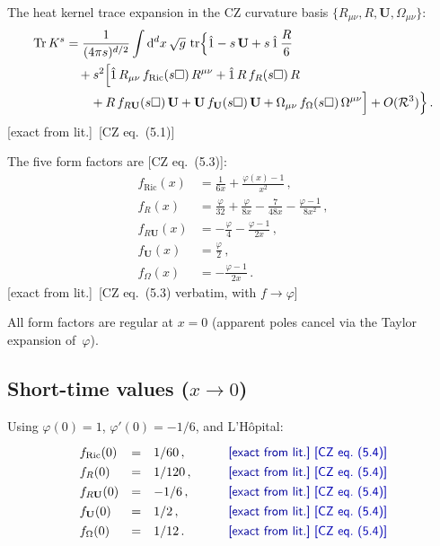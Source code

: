 \documentclass[12pt,a4paper]{article}
\theoremstyle{definition}
\theoremstyle{remark}
\newcommand{\Tr}{\operatorname{Tr}}
\newcommand{\tr}{\operatorname{tr}}
\newcommand{\dd}{\mathrm{d}}
\newcommand{\fromlit}[1]{\textcolor{blue!70!black}{\textsf{[#1]}}}
\newcommand{\exactlit}{\textcolor{blue!60!black}{\textsf{[exact from lit.]}}}
\begin{document}
The heat kernel trace expansion in the CZ curvature basis
$\{R_{\mu\nu}, R, \mathbf{U}, \Omega_{\mu\nu}\}$:
\begin{align}
  \Tr K^s &= \frac{1}{(4\pi s)^{d/2}}\int \dd^d x\,\sqrt{g}\,\tr\Bigl\{
    \hat{1} - s\,\mathbf{U} + s\,\hat{1}\,\frac{R}{6}
    \nonumber\\
  &\quad + s^2\Bigl[
    \hat{1}\,R_{\mu\nu}\,f_{\mathrm{Ric}}(s\Box)\,R^{\mu\nu}
    + \hat{1}\,R\,f_R(s\Box)\,R
    \nonumber\\
  &\quad\quad
    + R\,f_{R\mathbf{U}}(s\Box)\,\mathbf{U}
    + \mathbf{U}\,f_{\mathbf{U}}(s\Box)\,\mathbf{U}
    + \Omega_{\mu\nu}\,f_\Omega(s\Box)\,\Omega^{\mu\nu}
  \Bigr] + O(\mathcal{R}^3)\Bigr\}\,.
  \label{eq:CZ-expansion}
\end{align}
\exactlit\ \fromlit{CZ eq.~(5.1)}

\medskip
The five form factors are \fromlit{CZ eq.~(5.3)}:
\begin{align}
  f_{\mathrm{Ric}}(x) &= \frac{1}{6x} + \frac{\varphi(x) - 1}{x^2}\,,
  \label{eq:f-Ric}\\[4pt]
  f_R(x) &= \frac{\varphi}{32} + \frac{\varphi}{8x}
    - \frac{7}{48x} - \frac{\varphi - 1}{8x^2}\,,
  \label{eq:f-R}\\[4pt]
  f_{R\mathbf{U}}(x) &= -\frac{\varphi}{4}
    - \frac{\varphi - 1}{2x}\,,
  \label{eq:f-RU}\\[4pt]
  f_{\mathbf{U}}(x) &= \frac{\varphi}{2}\,,
  \label{eq:f-U}\\[4pt]
  f_\Omega(x) &= -\frac{\varphi - 1}{2x}\,.
  \label{eq:f-Omega}
\end{align}
\exactlit\ \fromlit{CZ eq.~(5.3) verbatim, with $f \to \varphi$}

All form factors are regular at $x = 0$ (apparent poles cancel via
the Taylor expansion of~$\varphi$).

\subsection{Short-time values ($x \to 0$)}

Using $\varphi(0) = 1$, $\varphi'(0) = -1/6$, and L'H\^{o}pital:
\begin{equation}
\renewcommand{\arraystretch}{1.3}
\begin{array}{lclcl}
  f_{\mathrm{Ric}}(0) &=& 1/60\,, &\quad&
    \exactlit\ \fromlit{CZ eq.~(5.4)}\\
  f_R(0) &=& 1/120\,, &&
    \exactlit\ \fromlit{CZ eq.~(5.4)}\\
  f_{R\mathbf{U}}(0) &=& -1/6\,, &&
    \exactlit\ \fromlit{CZ eq.~(5.4)}\\
  f_{\mathbf{U}}(0) &=& 1/2\,, &&
    \exactlit\ \fromlit{CZ eq.~(5.4)}\\
  f_\Omega(0) &=& 1/12\,. &&
    \exactlit\ \fromlit{CZ eq.~(5.4)}
\end{array}
\label{eq:f-at-zero}
\end{equation}
\end{document}
